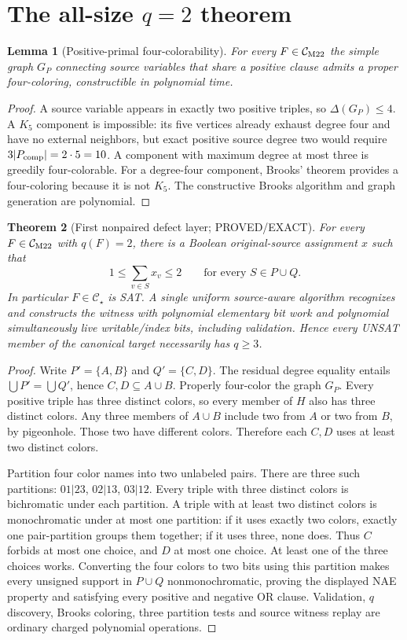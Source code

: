\documentclass[11pt]{article}
\newtheorem{theorem}{Theorem}
\newtheorem{lemma}[theorem]{Lemma}
\begin{document}
\section{The all-size $q=2$ theorem}
\begin{lemma}[Positive-primal four-colorability]
For every $F\in\mathcal C_{\rm M22}$ the simple graph
$G_P$ connecting source variables that share a
positive clause admits a proper four-coloring,
constructible in polynomial time.
\end{lemma}
\begin{proof}
A source variable appears in exactly two
positive triples, so $\Delta(G_P)\le4$.
A $K_5$ component is impossible: its five
vertices already exhaust degree four and
have no external neighbors, but exact
positive source degree two would require
$3|P_{\rm comp}|=2\cdot5=10$.
A component with maximum degree at most three
is greedily four-colorable. For a degree-four
component, Brooks' theorem provides a
four-coloring because it is not $K_5$.
The constructive Brooks algorithm and
graph generation are polynomial.
\end{proof}

\begin{theorem}[First nonpaired defect layer; PROVED/EXACT]
For every $F\in\mathcal C_{\rm M22}$ with
$q(F)=2$, there is a Boolean original-source
assignment $x$ such that
\[
 \boxed{1\le\sum_{v\in S}x_v\le2
 \qquad\text{for every }S\in P\cup Q.}
\]
In particular $F\in\mathcal C_\star$ is SAT.
A single uniform source-aware algorithm
recognizes and constructs the witness
with polynomial elementary bit work
and polynomial simultaneously live
writable/index bits, including validation.
Hence every UNSAT member of the canonical
target necessarily has $q\ge3$.
\end{theorem}
\begin{proof}
Write $P'=\{A,B\}$ and $Q'=\{C,D\}$.
The residual degree equality entails
$\bigcup P'=\bigcup Q'$, hence
$C,D\subseteq A\cup B$.
Properly four-color the graph $G_P$.
Every positive triple has three
distinct colors, so every member
of $H$ also has three distinct colors.
Any three members of $A\cup B$
include two from $A$ or two from $B$,
by pigeonhole. Those two have different
colors. Therefore each $C,D$ uses
at least two distinct colors.

Partition four color names into two
unlabeled pairs. There are three such
partitions: $01|23$, $02|13$, $03|12$.
Every triple with three distinct
colors is bichromatic under each
partition. A triple with at least
two distinct colors is monochromatic
under at most one partition: if it
uses exactly two colors, exactly
one pair-partition groups them
together; if it uses three, none does.
Thus $C$ forbids at most one choice,
and $D$ at most one choice. At least
one of the three choices works.
Converting the four colors to two
bits using this partition makes
every unsigned support in $P\cup Q$
nonmonochromatic, proving the
displayed NAE property and satisfying
every positive and negative OR clause.
Validation, $q$ discovery, Brooks
coloring, three partition tests and
source witness replay are ordinary
charged polynomial operations.
\end{proof}
\end{document}

